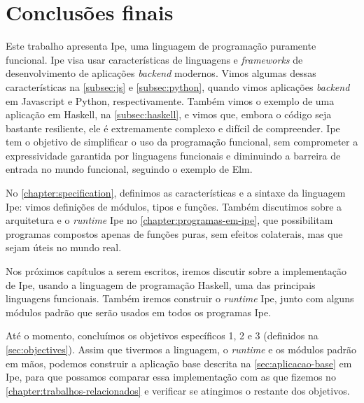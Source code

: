 
\chapter{Conclusões finais}

Este trabalho apresenta Ipe, uma linguagem de programação puramente funcional.
Ipe visa usar características de linguagens e \textit{frameworks} de desenvolvimento
de aplicações \textit{backend} modernos. Vimos algumas dessas características na
\autoref{subsec:js} e \autoref{subsec:python}, quando vimos aplicações \textit{backend}
em Javascript e Python, respectivamente. Também vimos o exemplo de uma aplicação
em Haskell, na \autoref{subsec:haskell}, e vimos que, embora o código seja bastante
resiliente, ele é extremamente complexo e difícil de compreender. Ipe tem o objetivo
de simplificar o uso da programação funcional, sem comprometer a expressividade
garantida por linguagens funcionais e diminuindo a barreira de entrada no mundo
funcional, seguindo o exemplo de Elm.

No \autoref{chapter:specification}, definimos as características e a sintaxe da
linguagem Ipe: vimos definições de módulos, tipos e funções. Também discutimos
sobre a arquitetura e o \textit{runtime} Ipe no \autoref{chapter:programas-em-ipe},
que possibilitam programas compostos apenas de funções puras, sem efeitos colaterais,
mas que sejam úteis no mundo real.

Nos próximos capítulos a serem escritos, iremos discutir sobre a implementação
de Ipe, usando a linguagem de programação Haskell, uma das principais linguagens
funcionais. Também iremos construir o \textit{runtime} Ipe, junto com alguns módulos
padrão que serão usados em todos os programas Ipe.

Até o momento, concluímos os objetivos específicos 1, 2 e 3 (definidos na
\autoref{sec:objectives}). Assim que tivermos a linguagem, o \textit{runtime} e
os módulos padrão em mãos, podemos construir a aplicação base descrita na
\autoref{sec:aplicacao-base} em Ipe, para que possamos comparar essa implementação
com as que fizemos no \autoref{chapter:trabalhos-relacionados} e verificar se
atingimos o restante dos objetivos.
